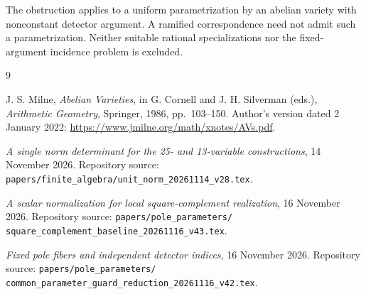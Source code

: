 \documentclass[11pt,a4paper]{article}
\theoremstyle{remark}\newtheorem{remark}[theorem]{Remark}
\begin{document}
The obstruction applies to a uniform parametrization by an abelian
variety with nonconstant detector argument. A ramified correspondence
need not admit such a parametrization. Neither suitable rational
specializations nor the fixed-argument incidence problem is excluded.

\begin{thebibliography}{9}
\raggedright
{}
J. S. Milne, \emph{Abelian Varieties}, in
G. Cornell and J. H. Silverman (eds.), \emph{Arithmetic Geometry},
Springer, 1986, pp.~103--150.
Author's version dated 2 January 2022:
\url{https://www.jmilne.org/math/xnotes/AVs.pdf}.

\emph{A single norm determinant for the 25- and 13-variable constructions},
14 November 2026. Repository source:
\texttt{papers/finite\_algebra/unit\_norm\_20261114\_v28.tex}.

\emph{A scalar normalization for local square-complement realization},
16 November 2026. Repository source:
\texttt{papers/pole\_parameters/}\\
\texttt{square\_complement\_baseline\_20261116\_v43.tex}.

\emph{Fixed pole fibers and independent detector indices},
16 November 2026. Repository source:
\texttt{papers/pole\_parameters/}\\
\texttt{common\_parameter\_guard\_reduction\_20261116\_v42.tex}.
\end{thebibliography}
\end{document}

